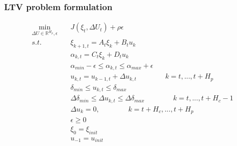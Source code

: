 \documentclass{beamer}
\begin{document}
\begin{frame}
\frametitle{LTV problem formulation }

\begin{align*}
\min_{\Delta U \in \mathbb{R}^{H_p}, \epsilon} \quad &J(\xi_t, \Delta U_t) +
\rho \epsilon \\
s.t. \qquad &\xi_{k+1,t} = A_t \xi_k + B_t u_k \\
&\alpha_{k,t} = C_t \xi_k + D_t u_k \\
&\alpha_{min} - \epsilon \leq \alpha_{k,t} \leq \alpha_{max} + \epsilon \\
&u_{k,t} = u_{k-1,t} + \Delta u_{k,t} \qquad \qquad k = t, . . . , t + H_p \\
&\delta_{min} \leq u_{k,t} \leq \delta_{max} \\ 
&\Delta \delta_{min} \leq \Delta u_{k,t} \leq \Delta \delta_{max} \qquad \qquad k = t, . . ., t + H_c - 1 \\
&\Delta u_k = 0, \qquad \qquad k = t + H_c, . . . , t + H_p \\
&\epsilon \geq 0 \\
&\xi_0 = \xi_{init} \\
& u_{-1} = u_{init}
\end{align*}

\end{frame}
\end{document}
